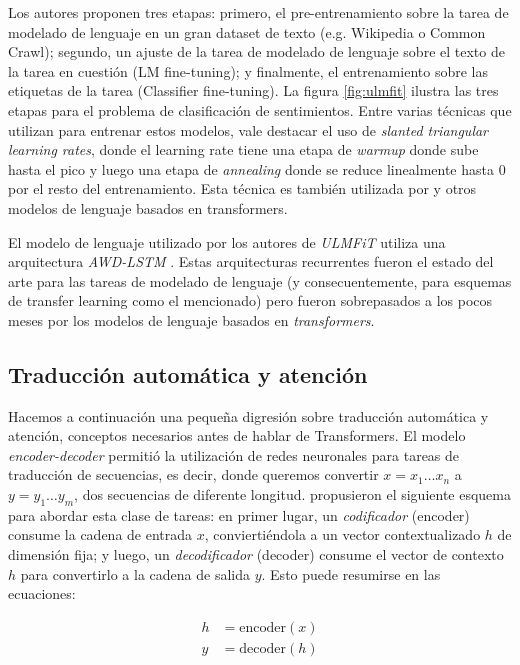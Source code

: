 Los autores proponen tres etapas: primero, el pre-entrenamiento sobre la tarea de modelado de lenguaje en un gran dataset de texto (e.g. Wikipedia o Common Crawl); segundo, un ajuste de la tarea de modelado de lenguaje sobre el texto de la tarea en cuestión (LM fine-tuning); y finalmente, el entrenamiento sobre las etiquetas de la tarea (Classifier fine-tuning). La figura \ref{fig:ulmfit} ilustra las tres etapas para el problema de clasificación de sentimientos. Entre varias técnicas que utilizan para entrenar estos modelos, vale destacar el uso de \emph{slanted triangular learning rates}, donde el learning rate tiene una etapa de \emph{warmup} donde sube hasta el pico y luego una etapa de \emph{annealing} donde se reduce linealmente hasta 0 por el resto del entrenamiento. Esta técnica es también utilizada por \bert{} y otros modelos de lenguaje basados en transformers.

El modelo de lenguaje utilizado por los autores de \emph{ULMFiT} utiliza una arquitectura \emph{AWD-LSTM} \cite{merity2018regularizing}. Estas arquitecturas recurrentes fueron el estado del arte para las tareas de modelado de lenguaje (y consecuentemente, para esquemas de transfer learning como el mencionado) pero fueron sobrepasados a los pocos meses por los modelos de lenguaje basados en \emph{transformers}.


\subsection{Traducción automática y atención}
\label{sec:02_transformers}


Hacemos a continuación una pequeña digresión sobre traducción automática y atención, conceptos necesarios antes de hablar de Transformers. El modelo \emph{encoder-decoder} permitió la utilización de redes neuronales para tareas de traducción de secuencias, es decir, donde queremos convertir $x = x_1 \ldots x_n$ a $y = y_1 \ldots y_m$, dos secuencias de diferente longitud. \citet{sutskever2014sequence} propusieron el siguiente esquema para abordar esta clase de tareas: en primer lugar, un \emph{codificador} (encoder) consume la cadena de entrada $x$,  conviertiéndola a un vector contextualizado $h$ de dimensión fija; y luego, un \emph{decodificador} (decoder) consume el vector de contexto $h$ para convertirlo a la cadena de salida $y$. Esto puede resumirse en las ecuaciones:

\begin{align*}
    h   &= \text{encoder}(x) \\
    y   &= \text{decoder}(h)
\end{align*}

